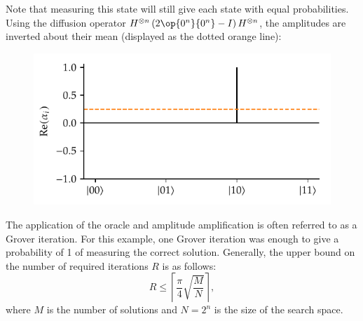 \noindent
Note that measuring this state will still give each state with equal probabilities.
Using the diffusion operator $H^{\otimes n}\left(2\op{0^n}{0^n} - I\right)H^{\otimes n}$, the amplitudes are inverted about their mean (displayed as the dotted orange line):
\begin{figure}[ht]
    \centering
    \includegraphics[width=0.45\linewidth]{figures/aa_diffused.pdf}
\end{figure}

\noindent
The application of the oracle and amplitude amplification is often referred to as a Grover iteration.
For this example, one Grover iteration was enough to give a probability of 1 of measuring the correct solution.
Generally, the upper bound on the number of required iterations $R$ is as follows:
\begin{equation}
R \leq \left\lceil \dfrac{\pi}{4}\sqrt{\dfrac{M}{N}} \right\rceil,
\end{equation}
where $M$ is the number of solutions and $N = 2^n$ is the size of the search space.